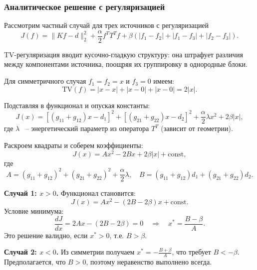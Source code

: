 \documentclass[a4paper,14pt,oneside,openany]{extarticle}
\begin{document}
\subsubsection{Аналитическое решение с регуляризацией}

Рассмотрим частный случай для трех источников с регуляризацией
\begin{equation}
    J(f) = \|Kf - d\|_2^2 + \frac{\alpha}{2}f^T T^T f + \beta (|f_1 - f_2| + |f_1 - f_3| + |f_2 - f_3|).
\end{equation}

TV-регуляризация вводит кусочно-гладкую структуру: она штрафует различия между компонентами источника,
 поощряя их группировку в однородные блоки.

Для симметричного случая $f_1 = f_2 = x$ и $f_3 = 0$ имеем:
\begin{equation}
    \mathrm{TV}(f) = |x - x| + |x - 0| + |x - 0| = 2|x|.
\end{equation}

Подставляя в функционал и опуская константы:
\begin{equation}
    J(x) = \left[(g_{11} + g_{12})x - d_1\right]^2 + \left[(g_{21} + g_{22})x - d_2\right]^2 + \frac{\alpha}{2} \lambda x^2 + 2\beta|x|,
\end{equation}
где $\lambda$ ~-- энергетический параметр из оператора $T^T$ (зависит от геометрии).

Раскроем квадраты и соберем коэффициенты:
\begin{equation}
    J(x) = A x^2 - 2B x + 2\beta|x| + \text{const},
\end{equation}
где
\begin{equation}
    A = (g_{11} + g_{12})^2 + (g_{21} + g_{22})^2 + \frac{\alpha}{2} \lambda, \quad B = (g_{11} + g_{12})d_1 + (g_{21} + g_{22})d_2.
\end{equation}

\textbf{Случай 1: $x > 0$.} Функционал становится:
\begin{equation}
    J(x) = A x^2 - (2B - 2\beta) x + \text{const}.
\end{equation}
Условие минимума:
\begin{equation}
    \frac{dJ}{dx} = 2A x - (2B - 2\beta) = 0 \quad \Rightarrow \quad x^* = \frac{B - \beta}{A}.
\end{equation}
Это решение валидно, если $x^* > 0$, т.е. $B > \beta$.

\textbf{Случай 2: $x < 0$.} Из симметрии получаем $x^* = -\frac{B + \beta}{A}$, что требует 
$B < -\beta$. Предполагается, что $B > 0$, поэтому неравенство выполнено всегда.
\end{document}
